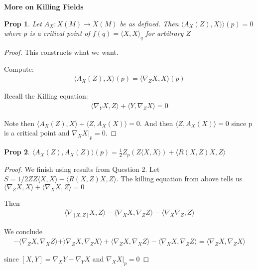 \documentclass[11pt]{article}
\newtheorem{prop}{Prop}
\begin{document}
\textbf{More on Killing Fields}

\begin{prop}
	Let $A_X : X(M) \to X(M)$ be as defined. Then $\langle A_X(Z),X)\rangle(p) = 0$ where $p$ is a critical point of $f(q) = \langle X,X\rangle_q$ for arbitrary $Z$
\end{prop}

\begin{proof}
	This constructs what we want.

	Compute:
	\begin{align*}
		\langle A_X(Z),X\rangle(p) = \langle \nabla_Z X,X \rangle (p)
	\end{align*}

	Recall the Killing equation:
	\begin{align*}
		\langle \nabla_Y X,Z\rangle + \langle Y,\nabla_Z X\rangle = 0
	\end{align*}

	Note then $\langle A_X(Z),X\rangle + \langle Z,A_X(X)\rangle = 0$. And then $\langle Z,A_X(X)\rangle = 0$ since p is a critical point and $\nabla_X X|_p = 0$.%

\end{proof}

\begin{prop}
	$\langle A_X(Z),A_X(Z) \rangle(p) = \frac{1}{2}Z_p(Z\langle X,X\rangle) + \langle R(X,Z)X,Z\rangle $
\end{prop}

\begin{proof}
	We finish using results from Question 2. Let $S = 1/2 ZZ\langle X,X\rangle - \langle R(X,Z)X,Z\rangle$. The killing equation from above tells us $\langle \nabla_Z X,X\rangle + \langle \nabla_X X,Z\rangle = 0$ 

	Then 
	\begin{align*}
		\langle \nabla_{[X,Z]}X,Z\rangle -\langle \nabla_X X,\nabla_Z Z\rangle - \langle \nabla_X \nabla_Z,Z\rangle
	\end{align*}

	We conclude
	\begin{align*}
		-\langle \nabla_Z X,\nabla_X Z\rangle + \rangle \nabla_Z X,\nabla_Z X\rangle + \langle \nabla_Z X, \nabla_X Z\rangle - \langle \nabla_X X,\nabla_Z Z\rangle = \langle \nabla_Z X,\nabla_Z X\rangle
	\end{align*}

	since $[X,Y] = \nabla_X Y - \nabla_Y X$ and $\nabla_X X|_p = 0$
\end{proof}
\end{document}
